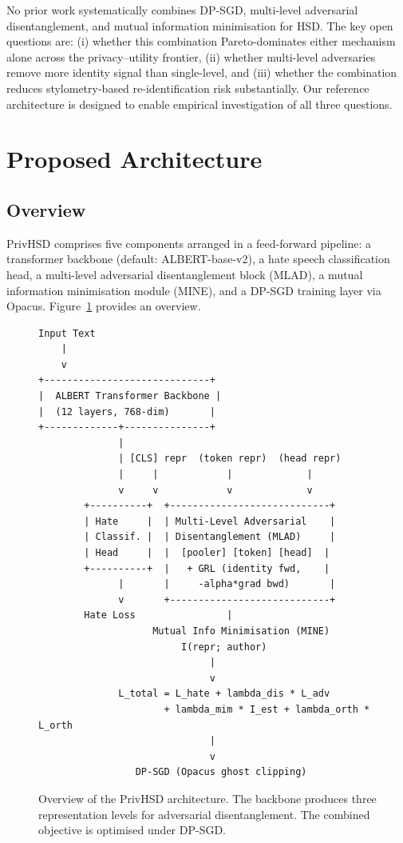 \documentclass{article}
\begin{document}
No prior work systematically combines DP-SGD, multi-level adversarial
disentanglement, and mutual information minimisation for HSD.
The key open questions are: (i) whether this combination Pareto-dominates
either mechanism alone across the privacy--utility frontier,
(ii) whether multi-level adversaries remove more identity signal than
single-level, and (iii) whether the combination reduces stylometry-based
re-identification risk substantially.
Our reference architecture is designed to enable empirical investigation
of all three questions.


\section{Proposed Architecture}
\label{sec:method}

\subsection{Overview}

PrivHSD comprises five components arranged in a feed-forward pipeline:
a transformer backbone (default: ALBERT-base-v2), a hate speech
classification head, a multi-level adversarial disentanglement block
(MLAD), a mutual information minimisation module (MINE), and a
DP-SGD training layer via Opacus.
Figure~\ref{fig:arch} provides an overview.

\begin{figure}[h]
  \centering
  \begin{verbatim}
Input Text
    |
    v
+-----------------------------+
|  ALBERT Transformer Backbone |
|  (12 layers, 768-dim)       |
+-------------+---------------+
              |
              | [CLS] repr  (token repr)  (head repr)
              |     |            |             |
              v     v            v             v
        +----------+  +----------------------------+
        | Hate     |  | Multi-Level Adversarial    |
        | Classif. |  | Disentanglement (MLAD)     |
        | Head     |  |  [pooler] [token] [head]  |
        +----------+  |   + GRL (identity fwd,    |
              |       |     -alpha*grad bwd)       |
              v       +----------------------------+
        Hate Loss                |
                    Mutual Info Minimisation (MINE)
                         I(repr; author)
                              |
                              v
              L_total = L_hate + lambda_dis * L_adv
                      + lambda_mim * I_est + lambda_orth * L_orth
                              |
                              v
                 DP-SGD (Opacus ghost clipping)
  \end{verbatim}
  \caption{Overview of the PrivHSD architecture. The backbone produces three
           representation levels for adversarial disentanglement. The combined
           objective is optimised under DP-SGD.}
  \label{fig:arch}
\end{figure}
\end{document}
